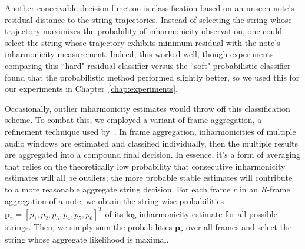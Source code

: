 \documentclass[12pt]{cmuthesis}
\DeclareMathOperator*{\argmax}{arg\,max}
\begin{document}
Another conceivable decision function is classification based on an unseen note's residual distance to the string trajectories. Instead of selecting the string whose trajectory maximizes the probability of inharmonicity observation, one could select the string whose trajectory exhibits minimum residual with the note's inharmonicity measurement. Indeed, this worked well, though experiments comparing this ``hard" residual classifier versus the ``soft" probabilistic classifier found that the probabilistic method performed slightly better, so we used this for our experiments in Chapter~\ref{chap:experiments}.

Occasionally, outlier inharmonicity estimates would throw off this classification scheme. To combat this, we employed a variant of frame aggregation, a refinement technique used by~\cite{abesser2012}. In frame aggregation, inharmonicities of multiple audio windows are estimated and classified individually, then the multiple results are aggregated into a compound final decision. In essence, it's a form of averaging that relies on the theoretically low probability that consecutive inharmonicity estimates will all be outliers; the more probable stable estimates will contribute to a more reasonable aggregate string decision. For each frame $r$ in an $R$-frame aggregation of a note, we obtain the string-wise probabilities $\mathbf{p_r} = [p_1,p_2,p_3,p_4,p_5,p_6]^T$ of its log-inharmonicity estimate for all possible strings. Then, we simply sum the probabilities $\mathbf{p_r}$ over all frames and select the string whose aggregate likelihood is maximal.
\end{document}
